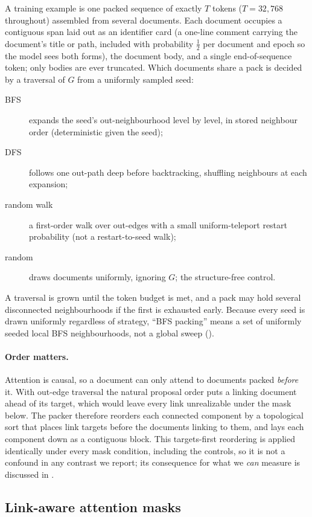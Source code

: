 A training example is one packed sequence of exactly $T$ tokens ($T=32{,}768$
throughout) assembled from several documents. Each document occupies a contiguous
span laid out as an identifier card (a one-line comment carrying the document's
title or path, included with probability $\tfrac12$ per document and epoch so the
model sees both forms), the document body, and a single end-of-sequence token; only
bodies are ever truncated. Which documents share a pack is decided by a traversal of
$G$ from a uniformly sampled seed:
\begin{description}
  \item[BFS] expands the seed's out-neighbourhood level by level, in stored neighbour
        order (deterministic given the seed);
  \item[DFS] follows one out-path deep before backtracking, shuffling neighbours at each
        expansion;
  \item[random walk] a first-order walk over out-edges with a small uniform-teleport
        restart probability (not a restart-to-seed walk);
  \item[random] draws documents uniformly, ignoring $G$; the structure-free control.
\end{description}
A traversal is grown until the token budget is met, and a pack may hold several
disconnected neighbourhoods if the first is exhausted early. Because every seed is drawn
uniformly regardless of strategy, ``BFS packing'' means a set of uniformly seeded local
BFS neighbourhoods, not a global sweep ().

\paragraph{Order matters.}
Attention is causal, so a document can only attend to documents packed \emph{before}
it. With out-edge traversal the natural proposal order puts a linking document ahead of
its target, which would leave every link unrealizable under the mask below. The packer
therefore reorders each connected component by a topological sort that places link
targets before the documents linking to them, and lays each component down as a
contiguous block. This targets-first reordering is applied identically under every
mask condition, including the controls, so it is not a confound in any contrast we
report; its consequence for what we \emph{can} measure is discussed in
.

\subsection{Link-aware attention masks}
\label{sec:method:masks}

